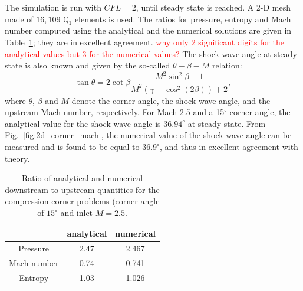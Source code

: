 \documentclass[preprint,10pt]{elsarticle}
\newcommand{\fig}[1]{Fig.~\ref{#1}}                      %
\newcommand{\tbl}[1]{Table~\ref{#1}}                     %
\newcommand{\tcr}[1]{\textcolor{red}{#1}}
\begin{document}
The simulation is run with $CFL=2$, until steady state is reached. A 2-D mesh made of $16,109$ $\mathbb{Q}_1$ elements is used. The ratios for pressure, entropy and Mach number computed using the  analytical and the numerical solutions are given in \tbl{tbl:corner_exact_sol}; they are in excellent agreement. \tcr{why only 2 significant digits for the analytical values but 3 for the numerical values?} The shock wave angle at steady state is also known and given by the so-called $\theta -\beta -M$ relation:
%
\begin{equation}
\tan \theta = 2 \cot \beta \frac{M^2 \sin^2 \beta -1}{M^2 \left(\gamma+\cos^2 (2\beta)\right)+2} ,
\end{equation}
%
where $\theta$, $\beta$ and $M$ denote the corner angle, the shock wave angle, and the upstream Mach number, respectively. For Mach 2.5 and a 15$^\circ$ corner angle, the analytical value for the shock wave angle is $36.94^{\circ}$ at steady-state. From \fig{fig:2d_corner_mach}, the numerical value of the shock wave angle can be measured and is found to be equal to $36.9^{\circ}$, and thus in excellent agreement with theory.
%
\begin{table}[H]
\begin{center}
\begin{tabular}{|c|c|c|}  \hline
            & analytical & numerical\\ \hline
Pressure    & 2.47       & 2.467    \\ \hline
Mach number &  0.74      & 0.741    \\ \hline
Entropy     & 1.03       & 1.026    \\ \hline 
\end{tabular}
\caption{\label{tbl:corner_exact_sol} Ratio of analytical and numerical downstream to upstream quantities for the compression corner problems (corner angle of $15^\circ$ and inlet $M=2.5$.}
\end{center}
\end{table}
%
\end{document}
